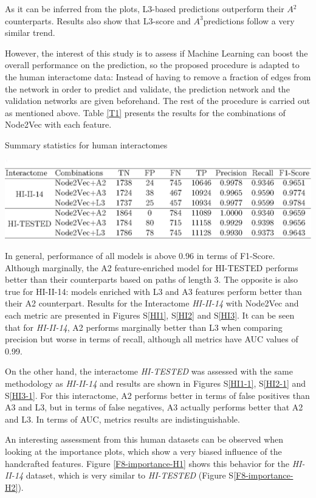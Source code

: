 As it can be inferred from the plots, L3-based predictions outperform
their $A{{}^2}$ counterparts. Results also show that L3-score and
$A^{3}$predictions follow a very similar trend.

However, the interest of this study is to assess if Machine Learning can boost
the overall performance on the prediction, so the proposed procedure
is adapted to the human interactome data: Instead of having to remove
a fraction of edges from the network in order to predict and validate,
the prediction network and the validation networks are given beforehand.
The rest of the procedure is carried out as mentioned above.
Table \ref{T1} presents the results for the combinations of Node2Vec
with each feature.

\begin{table}
\caption{\label{T1}Summary statistics for human interactomes}
\includegraphics[width=1\columnwidth]{figures/T1}
\end{table}

In general, performance of all models is above 0.96 in terms of F1-Score.
Although marginally, the A2 feature-enriched model for HI-TESTED performs
better than their counterparts based on paths of length 3. The opposite
is also true for HI-II-14: models enriched with L3 and A3 features
perform better than their A2 counterpart. Results for the Interactome
\emph{HI-II-14} with Node2Vec and each metric are presented in Figures
S\ref{HI1}, S\ref{HI2} and S\ref{HI3}. It can be seen that for
\emph{HI-II-14}, A2 performs marginally better than L3 when comparing
precision but worse in terms of recall, although all metrics have
AUC values of 0.99.

On the other hand, the interactome \emph{HI-TESTED} was assessed with
the same methodology as \emph{HI-II-14} and results are shown in Figures
S\ref{HI1-1}, S\ref{HI2-1} and S\ref{HI3-1}. For this interactome,
A2 performs better in terms of false positives than A3 and L3, but
in terms of false negatives, A3 actually performs better that A2 and
L3. In terms of AUC, metrics results are indistinguishable. 

An interesting assessment from this human datasets can be observed
when looking at the importance plots, which show a very biased influence
of the handcrafted features. Figure \ref{F8-importance-H1} shows
this behavior for the \emph{HI-II-14} dataset, which is very similar
to \emph{HI-TESTED} (Figure S\ref{F8-importance-H2}).

